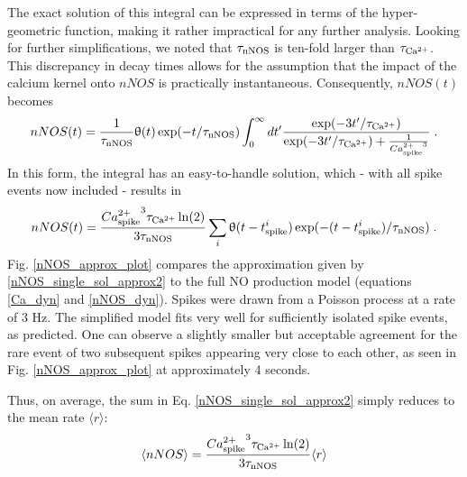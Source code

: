 \documentclass[10pt,letterpaper]{article}
\begin{document}
The exact solution of this integral can be expressed in terms of the hyper-geometric function, making it rather impractical for any further analysis. Looking for further simplifications, we noted that $\tau_{\rm nNOS}$ is ten-fold larger than $\tau_{\rm Ca^{2+}}$. This discrepancy in decay times allows for the assumption that the impact of the calcium kernel onto $nNOS$ is practically instantaneous. Consequently, $nNOS(t)$ becomes
\begin{equation}
nNOS(t) = \frac{1}{\tau_{\rm nNOS}} \uptheta(t) \exp(-t/\tau_{\rm nNOS}) \int_{0}^\infty dt' \frac{\exp(-3t'/\tau_{\rm Ca^{2+}})}{\exp(-3t'/\tau_{\rm Ca^{2+}}) + \frac{1}{{Ca^{2+}_{\rm spike}}^3}}\;.
\label{nNOS_single_sol_approx1}
\end{equation}
In this form, the integral has an easy-to-handle solution, which - with all spike events now included - results in
\begin{equation}
nNOS(t) = \frac{{Ca^{2+}_{\rm spike}}^3 \tau_{\rm Ca^{2+}}\ln(2)}{3\tau_{\rm nNOS}} \sum_i \uptheta(t-t^i_{\rm spike}) \exp(-(t-t^i_{\rm spike})/\tau_{\rm nNOS})\;.
\label{nNOS_single_sol_approx2}
\end{equation}
Fig. \ref{nNOS_approx_plot} compares the approximation given by \eqref{nNOS_single_sol_approx2} to the full NO production model (equations \eqref{Ca_dyn} and \eqref{nNOS_dyn}). Spikes were drawn from a Poisson process at a rate of 3 Hz. The simplified model fits very well for sufficiently isolated spike events, as predicted. One can observe a slightly smaller but acceptable agreement for the rare event of two subsequent spikes appearing very close to each other, as seen in Fig. \ref{nNOS_approx_plot} at approximately 4 seconds.

Thus, on average, the sum in Eq. \eqref{nNOS_single_sol_approx2} simply reduces to the mean rate $\langle r \rangle$:
\begin{equation}
\langle nNOS \rangle = \frac{{Ca^{2+}_{\rm spike}}^3 \tau_{\rm Ca^{2+}}\ln(2)}{3\tau_{\rm nNOS}} \langle r \rangle
\label{nNOS_single_sol_approx3}
\end{equation}
\end{document}
